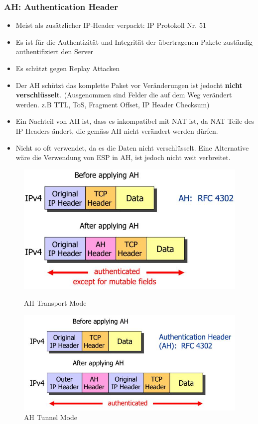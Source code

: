 \subsubsection{AH: Authentication Header}
\begin{itemize}
	\item Meist als zusätzlicher IP-Header verpackt: IP Protokoll Nr. 51
	\item Es ist für die Authentizität und Integrität der übertragenen Pakete zuständig authentifiziert den Server
	\item Es schützt gegen Replay Attacken
	\item Der AH schützt das komplette Paket vor Veränderungen ist jedocht \textbf{nicht verschlüsselt}. (Ausgenommen sind Felder die auf dem Weg verändert werden. z.B TTL, ToS, Fragment Offset, IP Header Checksum)
	\item Ein Nachteil von AH ist, dass es inkompatibel mit NAT ist, da NAT Teile des IP Headers ändert, die gemäss AH nicht verändert werden dürfen.
	\item Nicht so oft verwendet, da es die Daten nicht verschlüsselt. Eine Alternative wäre die Verwendung von ESP in AH, ist jedoch nicht weit verbreitet.
\end{itemize}

\begin{figure}[ht!]
    \centering
	\begin{minipage}[t]{0.45\textwidth}
        \includegraphics[width=\linewidth]{images/ipsec_ah_header}
        \caption{AH Transport Mode}
    \end{minipage}
	\begin{minipage}[t]{0.5\textwidth}
        \includegraphics[width=\linewidth]{images/ipsec_ah_transport}
        \caption{AH Tunnel Mode}
    \end{minipage}
\end{figure}






